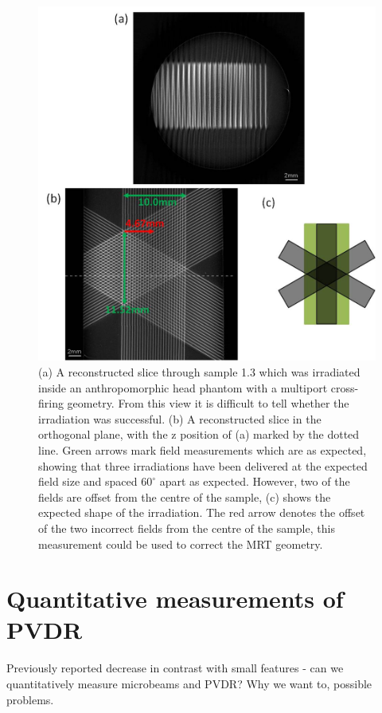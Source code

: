 	
	\begin{figure}
		\centering
		\includegraphics[width=0.9\linewidth]{mrt_img/mrt_Fig4}
		\caption{(a) A reconstructed slice through sample 1.3 which was irradiated inside an anthropomorphic head phantom with a multiport cross-firing geometry. From this view it is difficult to tell whether the irradiation was successful. (b) A reconstructed slice in the orthogonal plane, with the z position of (a) marked by the dotted line. Green arrows mark field measurements which are as expected, showing that three irradiations have been delivered at the expected field size and spaced $60^{\circ}$ apart as expected. However, two of the fields are offset from the centre of the sample, (c) shows the expected shape of the irradiation. The red arrow denotes the offset of the two incorrect fields from the centre of the sample, this measurement could be used to correct the MRT geometry.}
		\label{fig:Fig4L7}
	\end{figure}
	
	
	
	
	\section{Quantitative measurements of PVDR}
	\label{sec:quantPVDR}
	
	Previously reported decrease in contrast with small features - can we quantitatively measure microbeams and PVDR? Why we want to, possible problems.
	
